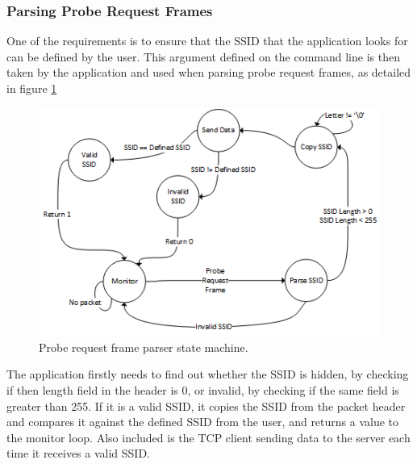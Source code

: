 \subsubsection{Parsing Probe Request Frames}
\label{parsing-probe}
One of the requirements is to ensure that the SSID that the application looks for can be defined by the user. This argument defined on the command line is then taken by the application and used when parsing probe request frames, as detailed in figure \ref{fig:ssid-machine}

\begin{figure}[h!]
\centering\includegraphics{design/figures/valid-ssid.png}
\caption{Probe request frame parser state machine.}
\label{fig:ssid-machine}
\end{figure}

The application firstly needs to find out whether the SSID is hidden, by checking if then length field in the header is 0, or invalid, by checking if the same field is greater than 255. If it is a valid SSID, it copies the SSID from the packet header and compares it against the defined SSID from the user, and returns a value to the monitor loop. Also included is the TCP client sending data to the server each time it receives a valid SSID. 

